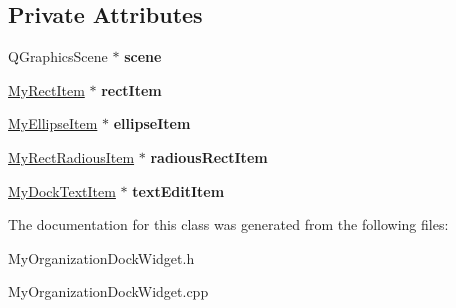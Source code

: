 \subsection*{Private Attributes}
\begin{DoxyCompactItemize}
\item 
\hypertarget{class_my_organization_dock_widget_aa26c44660c6f1ddfda8d2d582cdef1f5}{}Q\+Graphics\+Scene $\ast$ {\bfseries scene}\label{class_my_organization_dock_widget_aa26c44660c6f1ddfda8d2d582cdef1f5}

\item 
\hypertarget{class_my_organization_dock_widget_a8f6568ee33cfe9c30e1d74d0e5c16459}{}\hyperlink{class_my_rect_item}{My\+Rect\+Item} $\ast$ {\bfseries rect\+Item}\label{class_my_organization_dock_widget_a8f6568ee33cfe9c30e1d74d0e5c16459}

\item 
\hypertarget{class_my_organization_dock_widget_acf799fab09f604a2a66248806c6a0e26}{}\hyperlink{class_my_ellipse_item}{My\+Ellipse\+Item} $\ast$ {\bfseries ellipse\+Item}\label{class_my_organization_dock_widget_acf799fab09f604a2a66248806c6a0e26}

\item 
\hypertarget{class_my_organization_dock_widget_a183579a6a3a0032a4274f3b84ee9ff33}{}\hyperlink{class_my_rect_radious_item}{My\+Rect\+Radious\+Item} $\ast$ {\bfseries radious\+Rect\+Item}\label{class_my_organization_dock_widget_a183579a6a3a0032a4274f3b84ee9ff33}

\item 
\hypertarget{class_my_organization_dock_widget_a270d0baeae461281a18027cc4d3b363b}{}\hyperlink{class_my_dock_text_item}{My\+Dock\+Text\+Item} $\ast$ {\bfseries text\+Edit\+Item}\label{class_my_organization_dock_widget_a270d0baeae461281a18027cc4d3b363b}

\end{DoxyCompactItemize}


The documentation for this class was generated from the following files\+:\begin{DoxyCompactItemize}
\item 
My\+Organization\+Dock\+Widget.\+h\item 
My\+Organization\+Dock\+Widget.\+cpp\end{DoxyCompactItemize}
